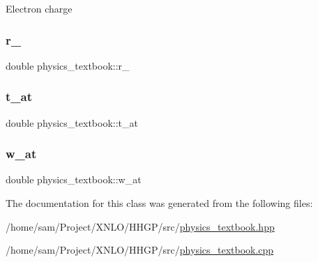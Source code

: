 Electron charge \mbox{\label{classphysics__textbook_ac429976f0dc885d846d8b31c24f45bd6}} 
\subsubsection{\texorpdfstring{r\+\_}{r\_0}}
{\footnotesize\ttfamily double physics\+\_\+textbook\+::r\+\_}

\mbox{\label{classphysics__textbook_acdcf772ff70c544f8394b3a9fc57674c}} 
\subsubsection{\texorpdfstring{t\+\_\+at}{t\_at}}
{\footnotesize\ttfamily double physics\+\_\+textbook\+::t\+\_\+at}

\mbox{\label{classphysics__textbook_a63250c79f053fa4aa1c8f3505971b4f1}} 
\subsubsection{\texorpdfstring{w\+\_\+at}{w\_at}}
{\footnotesize\ttfamily double physics\+\_\+textbook\+::w\+\_\+at}



The documentation for this class was generated from the following files\+:\begin{DoxyCompactItemize}
\item 
/home/sam/\+Project/\+X\+N\+L\+O/\+H\+H\+G\+P/src/\hyperlink{physics__textbook_8hpp}{physics\+\_\+textbook.\+hpp}\item 
/home/sam/\+Project/\+X\+N\+L\+O/\+H\+H\+G\+P/src/\hyperlink{physics__textbook_8cpp}{physics\+\_\+textbook.\+cpp}\end{DoxyCompactItemize}
